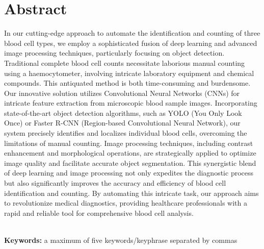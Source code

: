 \chapter*{\center \Large  Abstract}

In our cutting-edge approach to automate the identification and counting of three blood cell 
types, we employ a sophisticated fusion of deep learning and advanced image processing 
techniques, particularly focusing on object detection. Traditional complete blood cell counts 
necessitate laborious manual counting using a haemocytometer, involving intricate laboratory 
equipment and chemical compounds. This antiquated method is both time-consuming and burdensome. 
Our innovative solution utilizes Convolutional Neural Networks (CNNs) for intricate feature 
extraction from microscopic blood sample images. Incorporating state-of-the-art object 
detection algorithms, such as YOLO (You Only Look Once) or Faster R-CNN (Region-based 
Convolutional Neural Network), our system precisely identifies and localizes individual blood 
cells, overcoming the limitations of manual counting. Image processing techniques, including 
contrast enhancement and morphological operations, are strategically applied to optimize image 
quality and facilitate accurate object segmentation. This synergistic blend of deep learning 
and image processing not only expedites the diagnostic process but also significantly improves 
the accuracy and efficiency of blood cell identification and counting. By automating this 
intricate task, our approach aims to revolutionize medical diagnostics, providing healthcare 
professionals with a rapid and reliable tool for comprehensive blood cell analysis.

~\\[1cm]
\noindent %
\textbf{Keywords:} a maximum of five keywords/keyphrase separated by commas

\vfill
\noindent


